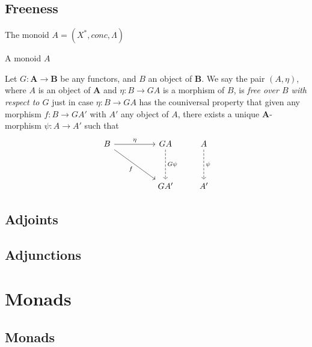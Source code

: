 \documentclass{article}
\begin{document}
\subsection{Freeness}
\begin{exam}[{\cite{AM75}}]
The monoid $A=(X^{*}, conc, \Lambda)$
\end{exam}

\begin{lem}[{\cite{AM75}}]
A monoid $A$
\end{lem}

\begin{defn}
Let $G: \mathbf{A} \rightarrow \mathbf{B}$ be any functors, and $B$ an object of $\mathbf{B}$.
We say the pair $(A, \eta)$, where $A$ is an object of $\mathbf{A}$ and $\eta: B \rightarrow GA$ is a morphism of $B$,
is \emph{free over $B$ with respect to $G$} just in case $\eta: B \rightarrow GA$ has the couniversal property that
given any morphism $f: B \rightarrow GA'$ with $A'$ any object of $A$,
there exists a unique $\mathbf{A}$-morphism $\psi: A \rightarrow A'$ such that
\[
\begin{tikzcd}[row sep=huge, column sep=huge]
B \arrow[r, "\eta"] \arrow[rd, "f"'] & GA \arrow[d, dashrightarrow, "G\psi"] \\
                                     & GA'
\end{tikzcd}
\qquad
\begin{tikzcd}[row sep=huge, column sep=huge]
A \arrow[d, dashrightarrow, "\psi"] \\
A'
\end{tikzcd}
\]
\end{defn}

\subsection{Adjoints}

\subsection{Adjunctions}

\section{Monads}
\subsection{Monads}
\end{document}
